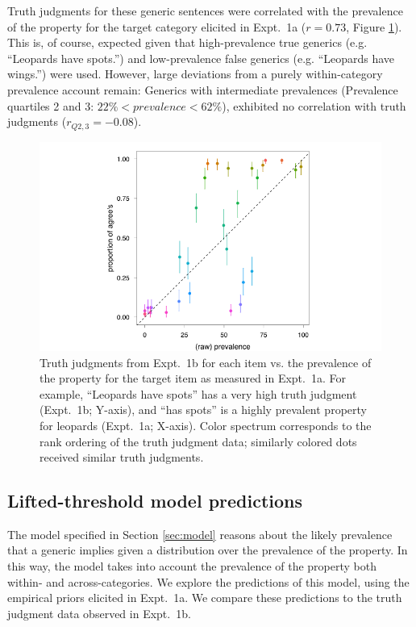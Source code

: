 \documentclass[10pt,letterpaper]{article}
\begin{document}
Truth judgments for these generic sentences were correlated with the prevalence of the property for the target category elicited in Expt.~1a ($r = 0.73$, Figure \ref{fig:scatterprev}). This is, of course, expected given that high-prevalence true generics (e.g. ``Leopards have spots.'') and low-prevalence false generics (e.g. ``Leopards have wings.'') were used. 
However, large deviations from a purely within-category prevalence account remain: Generics with intermediate prevalences (Prevalence quartiles 2 and 3: $ 22\% < prevalence < 62\%$), exhibited no correlation with truth judgments ($r_{Q2,3} = -0.08$).


\begin{figure}
\centering
    \includegraphics[width=0.8\columnwidth]{tj_n50_tjVsPrevalence}
    \caption{Truth judgments from Expt.~1b for each item vs. the prevalence of the property for the target item as measured in Expt.~1a. For example, ``Leopards have spots'' has a very high truth judgment (Expt.~1b; Y-axis), and ``has spots'' is a highly prevalent property for leopards (Expt.~1a; X-axis). Color spectrum corresponds to the rank ordering of the truth judgment data; similarly colored dots received similar truth judgments.}
  \label{fig:scatterprev}
\end{figure}




\subsection{Lifted-threshold model predictions}

The model specified in Section \ref{sec:model} reasons about the likely prevalence that a generic implies given a distribution over the prevalence of the property. 
In this way, the model takes into account the prevalence of the property both within- and across-categories.
We explore the predictions of this model, using the empirical priors elicited in Expt.~1a. 
We compare these predictions to the truth judgment data observed in Expt.~1b.
\end{document}
